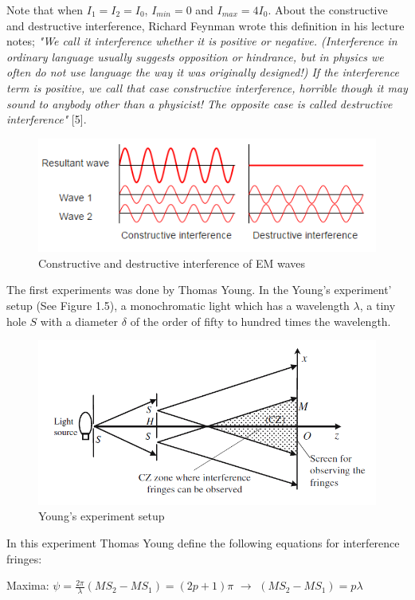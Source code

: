 \documentclass[a4paper,12pt]{report}
\begin{document}
Note that when $I_{1}=I_{2}=I_{0}$, $I_{min}=0$ and $I_{max}=4I_{0}$. About the constructive and destructive interference, Richard Feynman wrote this definition in his lecture notes; \textit{"We call it interference whether it is positive or negative.
(Interference in ordinary language usually suggests opposition or hindrance, but
in physics we often do not use language the way it was originally designed!) If the
interference term is positive, we call that case constructive interference, horrible
though it may sound to anybody other than a physicist! The opposite case is
called destructive interference"} [5]. 
\begin{figure}[h]
\centering
\includegraphics[width=0.8\linewidth, height=0.2\textheight]{interference}
\caption{Constructive and destructive interference of EM waves}
\label{fig:interference}
\end{figure}
The first experiments was done by Thomas Young. In the Young's experiment' setup (See Figure 1.5), a monochromatic light which has a wavelength $\lambda$, a tiny hole $S$ with a diameter $\delta$ of the order of fifty to hundred times the wavelength. 
\begin{figure}[h!]
\centering
\includegraphics[width=0.9\linewidth, height=0.32\textheight]{young}
\caption{Young's experiment setup}
\label{fig:young}
\end{figure}
In this experiment Thomas Young define the following equations for interference fringes:
\begin{center}
Maxima: $\psi=\frac{2\pi}{\lambda}(MS_{2}-MS_{1})=(2p+1)\pi$ $\longrightarrow$ $(MS_{2}-MS_{1})=p\lambda$
\end{center}
\end{document}
